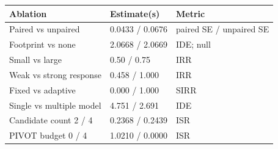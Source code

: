 \begin{tabular}{lll}
\toprule
Ablation & Estimate(s) & Metric \\
\midrule
Paired vs unpaired & 0.0433 / 0.0676 & paired SE / unpaired SE \\
Footprint vs none & 2.0668 / 2.0669 & IDE; null \\
Small vs large & 0.50 / 0.75 & IRR \\
Weak vs strong response & 0.458 / 1.000 & IRR \\
Fixed vs adaptive & 0.000 / 1.000 & SIRR \\
Single vs multiple model & 4.751 / 2.691 & IDE \\
Candidate count 2 / 4 & 0.2368 / 0.2439 & ISR \\
PIVOT budget 0 / 4 & 1.0210 / 0.0000 & ISR \\
\bottomrule
\end{tabular}
